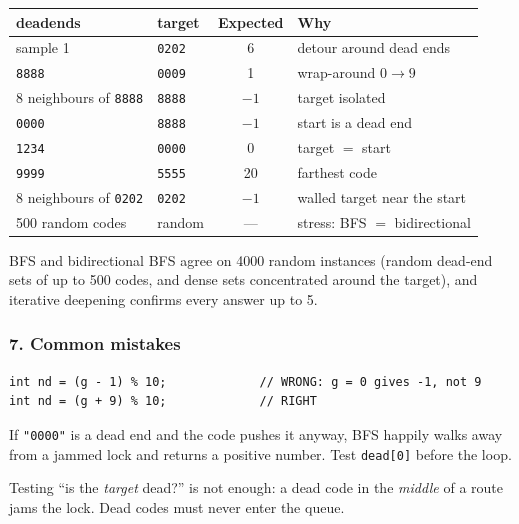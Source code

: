 \begin{testbox}
\centering\small
\begin{tabular}{@{}llcl@{}}
\toprule
\textbf{deadends} & \textbf{target} & \textbf{Expected} & \textbf{Why} \\
\midrule
sample 1 & \texttt{0202} & 6 & detour around dead ends \\
\texttt{8888} & \texttt{0009} & 1 & wrap-around $0 \to 9$ \\
8 neighbours of \texttt{8888} & \texttt{8888} & $-1$ & target isolated \\
\texttt{0000} & \texttt{8888} & $-1$ & start is a dead end \\
\texttt{1234} & \texttt{0000} & 0 & target $=$ start \\
\texttt{9999} & \texttt{5555} & 20 & farthest code \\
8 neighbours of \texttt{0202} & \texttt{0202} & $-1$ & walled target near the start \\
500 random codes & random & --- & stress: BFS $=$ bidirectional \\
\bottomrule
\end{tabular}
\end{testbox}

BFS and bidirectional BFS agree on 4000 random instances (random dead-end sets of up to 500 codes, and dense sets concentrated around the target), and iterative deepening confirms every answer up to 5.

\subsubsection*{7. Common mistakes}

\begin{warningbox}
\begin{lstlisting}[style=snippet]
int nd = (g - 1) % 10;             // WRONG: g = 0 gives -1, not 9
int nd = (g + 9) % 10;             // RIGHT
\end{lstlisting}
\end{warningbox}

\begin{warningbox}
If \texttt{"0000"} is a dead end and the code pushes it anyway, BFS happily walks away from a jammed lock and returns a positive number. Test \texttt{dead[0]} before the loop.
\end{warningbox}

\begin{warningbox}
Testing ``is the \emph{target} dead?'' is not enough: a dead code in the \emph{middle} of a route jams the lock. Dead codes must never enter the queue.
\end{warningbox}

